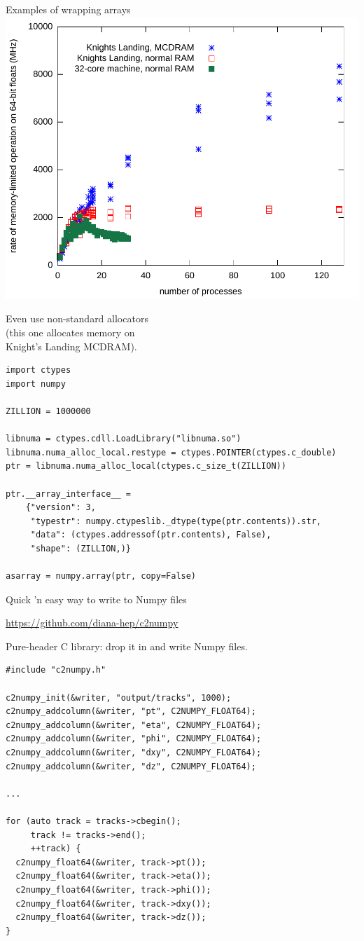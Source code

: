 \documentclass{beamer}
\begin{document}
\begin{frame}[fragile]{Examples of wrapping arrays}
\vspace{0.5 cm}
\hfill \includegraphics[height=3.5 cm]{knl-scaling.pdf}

\vspace{-3.5 cm}
Even use non-standard allocators \\ (this one allocates memory on \\ Knight's Landing MCDRAM).

\vspace{0.25 cm}
\scriptsize
\begin{verbatim}
import ctypes
import numpy

ZILLION = 1000000

libnuma = ctypes.cdll.LoadLibrary("libnuma.so")
libnuma.numa_alloc_local.restype = ctypes.POINTER(ctypes.c_double)
ptr = libnuma.numa_alloc_local(ctypes.c_size_t(ZILLION))

ptr.__array_interface__ =
    {"version": 3,
     "typestr": numpy.ctypeslib._dtype(type(ptr.contents)).str,
     "data": (ctypes.addressof(ptr.contents), False),
     "shape": (ZILLION,)}

asarray = numpy.array(ptr, copy=False)
\end{verbatim}
\end{frame}

\begin{frame}[fragile]{Quick 'n easy way to write to Numpy files}
\begin{center}
\textcolor{blue}{\underline{\url{https://github.com/diana-hep/c2numpy}}}
\end{center}

Pure-header C library: drop it in and write Numpy files.

\vspace{0.25 cm}
\scriptsize
\begin{verbatim}
#include "c2numpy.h"

c2numpy_init(&writer, "output/tracks", 1000);
c2numpy_addcolumn(&writer, "pt", C2NUMPY_FLOAT64);
c2numpy_addcolumn(&writer, "eta", C2NUMPY_FLOAT64);
c2numpy_addcolumn(&writer, "phi", C2NUMPY_FLOAT64);
c2numpy_addcolumn(&writer, "dxy", C2NUMPY_FLOAT64);
c2numpy_addcolumn(&writer, "dz", C2NUMPY_FLOAT64);

...

for (auto track = tracks->cbegin();
     track != tracks->end();
     ++track) {
  c2numpy_float64(&writer, track->pt());
  c2numpy_float64(&writer, track->eta());
  c2numpy_float64(&writer, track->phi());
  c2numpy_float64(&writer, track->dxy());
  c2numpy_float64(&writer, track->dz());
}
\end{verbatim}
\end{frame}
\end{document}
